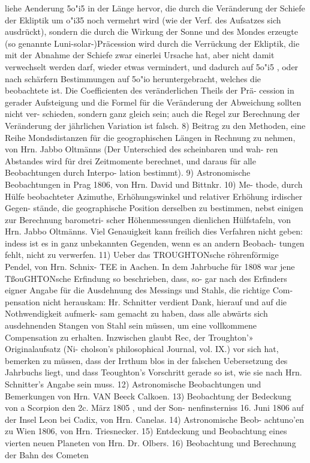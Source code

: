 \documentclass[12pt,a4paper]{article}
\begin{document}
liehe  Aenderung  5o"i5    in  der  Länge  hervor,   die  durch   die  Veränderung  der  Schiefe  der  Ekliptik  um o"i35  noch  vermehrt  wird  (wie  der  Verf.  des  Aufsatzes  sich  ausdrückt),  sondern  die  durch  die  Wirkung der  Sonne  und  des  Mondes  erzeugte  (so  genannte  Luni-solar-)Präcession  wird  durch  die  Verrückung  der Ekliptik,  die  mit  der  Abnahme  der  Schiefe  zwar  einerlei  Ursache   hat,    aber    nicht  damit   verwechselt werden  darf,  wieder  etwas  vermindert,  und  dadurch  auf  5o"i5  ,    oder  nach  schärfern  Bestimmungen  auf 5o"io  heruntergebracht,  welches  die  beobachtete  ist.     Die  Coefficienten  des  veränderlichen  Theils  der  Prä- cession  in  gerader  Aufsteigung  und  die  Formel  für  die  Veränderung  der  Abweichung  sollten  nicht  ver- schieden,    sondern  ganz  gleich  sein;    auch    die  Regel    zur  Berechnung  der  Veränderung   der  jährlichen Variation  ist  falsch.     8)  Beitrag  zu  den  Methoden,    eine   Reihe  Mondsdistanzen    für   die  geographischen Längen  in  Rechnung  zu  nehmen,  von  Hrn.  Jabbo  Oltmänns  (Der  Unterschied  des  scheinbaren  und  wah- ren Abstandes  wird  für  drei  Zeitmomente  berechnet,  und  daraus  für  alle  Beobachtungen  durch  Interpo- lation bestimmt).     9)  Astronomische  Beobachtungen  in  Prag  1806,  von  Hrn.  David  und  Bittnkr.     10)  Me- thode, durch  Hülfe  beobachteter  Azimuthe,    Erhöhungswinkel   und  relativer  Erhöhung  irdischer  Gegen- stände, die  geographische  Position  derselben   zu  bestimmen,    nebst   einigen   zur  Berechnung  barometri- scher Höhenmessungen  dienlichen  Hülfstafeln,  von  Hrn.  Jabbo  Oltmänns.     Viel  Genauigkeit  kann  freilich dies  Verfahren  nicht  geben:  indess  ist  es  in  ganz  unbekannten  Gegenden,  wenn  es  an  andern  Beobach- tungen fehlt,  nicht  zu  verwerfen.     11)  Ueber  das  TROUGHTONsche  röhrenförmige  Pendel,  von  Hrn.  Schnix- TEE  in  Aachen.     In  dem  Jahrbuche  für  1808  war  jene  TßouGHTONsche  Erfindung  so  beschrieben,  dass,  so- gar nach  des  Erfinders  eigner  Angabe  für  die  Ausdehnung  des  Messings  und  Stahls,   die  richtige  Com- pensation  nicht  herauskam:  Hr.  Schnitter  verdient  Dank,  hierauf  und  auf  die  Nothwendigkeit  aufmerk- sam gemacht  zu  haben,  dass  alle  abwärts  sich  ausdehnenden  Stangen  von  Stahl  sein  müssen,    um   eine vollkommene  Compensation  zu  erhalten.     Inzwischen  glaubt  Rec,  der  Troughton'»   Originalaufsatz  (Ni- cholson's  philosophical  Journal,  vol.  IX.)  vor  sich  hat,   bemerken  zu  müssen,    dass   der  Irrthum   blos  in der  falschen  Uebersetzung  des  Jahrbuchs  liegt,  und  dass  Teoughton's  Vorschritt  gerade  so  ist,    wie   sie nach  Hrn.  Schnitter's  Angabe  sein  muss.     12)  Astronomische  Beobachtungen  und  Bemerkungen  von  Hrn. VAN  Beeck  Calkoen.     13)  Beobachtung  der  Bedeckung  von  a  Scorpion  den  2c.  März  1805 ,    und  der  Son- nenfinsterniss  16.  Juni  1806  auf  der  Insel  Leon  bei  Cadix,  von  Hrn.  Canelas.      14)  Astronomische  Beob- achtuno'en  zu  Wien  1806,  von  Hrn.  Triesnecker.     15)  Entdeckung  und  Beobachtung  eines  vierten  neuen Planeten  von  Hrn.  Dr.  Olbers.     16)  Beobachtung  und  Berechnung  der  Bahn  des  Cometen  
\end{document}
